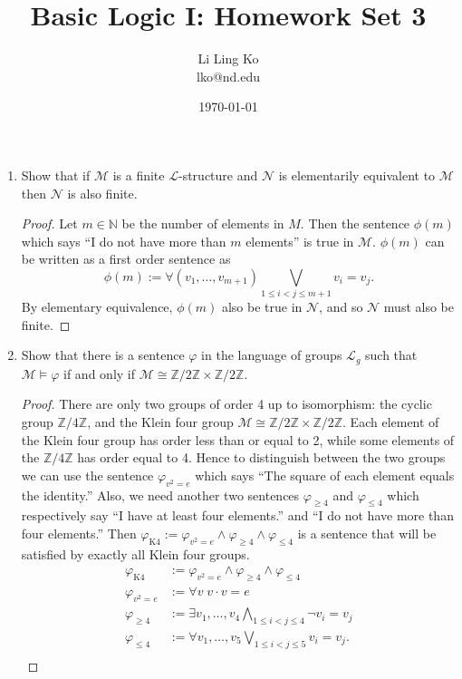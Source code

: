 \documentclass{article}
\begin{document}
\title{Basic Logic I: Homework Set 3}
\author{Li Ling Ko\\ lko@nd.edu}
\date{\today}
\maketitle

\begin{enumerate}
  \item Show that if $\mathcal{M}$ is a finite $\mathcal{L}$-structure and
    $\mathcal{N}$ is elementarily equivalent to $\mathcal{M}$ then
    $\mathcal{N}$ is also finite.
    \begin{proof}
      Let $m\in\mathbb{N}$ be the number of elements in $M$. Then the
      sentence $\phi(m)$ which says ``I do not have more than $m$
      elements'' is true in $\mathcal{M}$. $\phi(m)$ can be written as a
      first order sentence as
      \begin{equation*}
        \phi(m) := \forall(v_1,\ldots,v_{m+1}) \mathop{\bigvee}_{1\leq
        i<j\leq m+1} v_i=v_j.
      \end{equation*}
      By elementary equivalence, $\phi(m)$ also be true in $\mathcal{N}$,
      and so $\mathcal{N}$ must also be finite.
    \end{proof}

  \item Show that there is a sentence $\varphi$ in the language of groups
    $\mathcal{L}_g$ such that $\mathcal{M}\models\varphi$ if and only if
    $\mathcal{M}\cong\mathbb{Z}/2\mathbb{Z}\times\mathbb{Z}/2\mathbb{Z}$.
    \begin{proof}
      There are only two groups of order 4 up to isomorphism: the cyclic
      group $\mathbb{Z}/4\mathbb{Z}$, and the Klein four group
      $\mathcal{M}\cong\mathbb{Z}/2\mathbb{Z}\times\mathbb{Z}/2\mathbb{Z}$.
      Each element of the Klein four group has order less than or equal to
      2, while some elements of the $\mathbb{Z}/4\mathbb{Z}$ has order
      equal to 4. Hence to distinguish between the two groups we can use
      the sentence $\varphi_{v^2=e}$ which says ``The square of each
      element equals the identity.'' Also, we need another two sentences
      $\varphi_{\geq4}$ and $\varphi_{\leq4}$ which respectively say ``I
      have at least four elements.'' and ``I do not have more than four
      elements.'' Then
      $\varphi_{\text{K4}}:=\varphi_{v^2=e}\wedge\varphi_{\geq4}\wedge\varphi_{\leq4}$
      is a sentence that will be satisfied by exactly all Klein four
      groups.
      \begin{align*}
        \varphi_{\text{K4}}   &:=
          \varphi_{v^2=e}\wedge\varphi_{\geq4}\wedge\varphi_{\leq4} \\
        \varphi_{v^2=e} &:= \forall v\; v\cdot v=e \\
        \varphi_{\geq4} &:= \exists v_1,\ldots,v_4 \bigwedge_{1\leq i<j\leq 4}
          \neg v_i=v_j \\
        \varphi_{\leq4} &:= \forall v_1,\ldots,v_5 \mathop{\bigvee}_{1\leq
          i<j\leq 5} v_i=v_j. \\
      \end{align*}
    \end{proof}


\end{enumerate}
\end{document}
